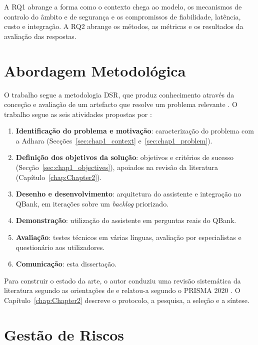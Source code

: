 A RQ1 abrange a forma como o contexto chega ao modelo, os mecanismos de controlo do âmbito e de segurança e os compromissos de fiabilidade, latência, custo e integração. A RQ2 abrange os métodos, as métricas e os resultados da avaliação das respostas.

\section{Abordagem Metodológica}
\label{sec:chap1_method}

O trabalho segue a metodologia \gls{DSR}, que produz conhecimento através da conceção e avaliação de um artefacto que resolve um problema relevante \parencite{hevner2004design}. O trabalho segue as seis atividades propostas por \textcite{peffers2007design}:
\begin{enumerate}
    \item \textbf{Identificação do problema e motivação}: caracterização do problema com a Adhara (Secções~\ref{sec:chap1_context} e~\ref{sec:chap1_problem}).
    \item \textbf{Definição dos objetivos da solução}: objetivos e critérios de sucesso (Secção~\ref{sec:chap1_objectives}), apoiados na revisão da literatura (Capítulo~\ref{chap:Chapter2}).
    \item \textbf{Desenho e desenvolvimento}: arquitetura do assistente e integração no QBank, em iterações sobre um \emph{backlog} priorizado.
    \item \textbf{Demonstração}: utilização do assistente em perguntas reais do QBank.
    \item \textbf{Avaliação}: testes técnicos em várias línguas, avaliação por especialistas e questionário aos utilizadores.
    \item \textbf{Comunicação}: esta dissertação.
\end{enumerate}

Para construir o estado da arte, o autor conduziu uma revisão sistemática da literatura segundo as orientações de \textcite{kitchenham2007guidelines} e relatou-a segundo o \gls{PRISMA} 2020 \parencite{page2021prisma}. O Capítulo~\ref{chap:Chapter2} descreve o protocolo, a pesquisa, a seleção e a síntese.

\section{Gestão de Riscos}
\label{sec:chap1_risks}


